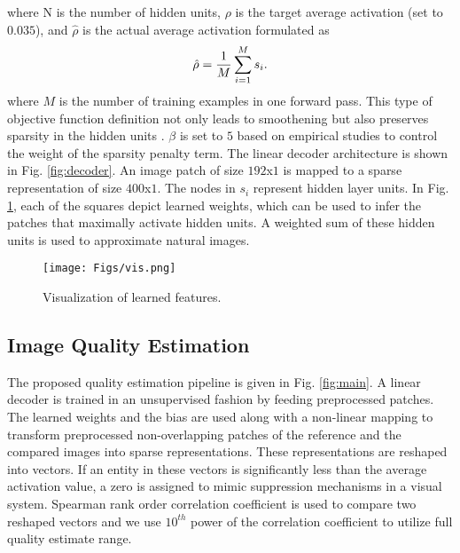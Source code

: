 \documentclass[draftcls,12pt, onecolumn]{IEEEtran}
\begin{document}
where N is the number of hidden units, $\rho$ is the target average activation (set to $0.035$), and $\hat\rho$ is the actual average activation formulated as
\vspace{-3.5mm}
\begin{equation}
\hat\rho = \frac{1}{M}\sum_{i=1}^{M} s_i.  
\vspace{-1.0mm}
\end{equation}
where $M$ is the number of training examples in one forward pass. This type of objective function definition not only leads to smoothening but also preserves sparsity in the hidden units \cite{bradley2008differential}.
$\beta$ is set to $5$ based on empirical studies
to control the weight of the sparsity penalty term. The linear decoder architecture is shown in Fig. \ref{fig:decoder}. An image patch of size $192$x$1$ is mapped to a sparse representation of size $400$x$1$. The nodes in $s_i$ represent hidden layer units. In Fig. \ref{fig:vis}, each of the squares depict learned weights, which can be used to infer the patches that maximally activate hidden units. A weighted sum of these hidden units is used to approximate natural images.
\begin{figure}[htbp!]\label{Visualize}
	\begin{center}
		\noindent
		\texttt{[image: Figs/vis.png]}
		\vspace{-1.0mm}
		\caption{Visualization of learned features.}
		\vspace{-1.0mm}
		\label{fig:vis}
	\end{center}
\vspace{-8.0mm}
\end{figure}
\subsection{Image Quality Estimation}
\vspace{-0.5mm}
The proposed quality estimation pipeline is given in Fig. \ref{fig:main}.
A linear decoder is trained in an unsupervised fashion by feeding preprocessed patches. The learned weights and the bias are used along with a non-linear mapping to transform preprocessed non-overlapping patches of the reference and the compared images into sparse representations. These representations are reshaped into vectors. If an entity in these vectors is significantly less than the average activation value, a zero is assigned to mimic suppression mechanisms in a visual system. Spearman rank order correlation coefficient is used to compare two reshaped vectors and we use $10^{th}$ power of the correlation coefficient to utilize full quality estimate range.
	\vspace{-1.0mm}
\end{document}
